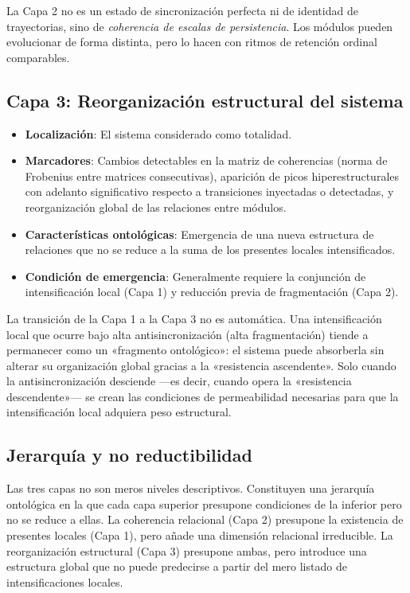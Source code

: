 La Capa 2 no es un estado de sincronización perfecta ni de identidad de trayectorias, sino de \textit{coherencia de escalas de persistencia}. Los módulos pueden evolucionar de forma distinta, pero lo hacen con ritmos de retención ordinal comparables.

\subsection{Capa 3: Reorganización estructural del sistema}

\begin{itemize}
    \item \textbf{Localización}: El sistema considerado como totalidad.
    \item \textbf{Marcadores}: Cambios detectables en la matriz de coherencias (norma de Frobenius entre matrices consecutivas), aparición de picos hiperestructurales con adelanto significativo respecto a transiciones inyectadas o detectadas, y reorganización global de las relaciones entre módulos.
    \item \textbf{Características ontológicas}: Emergencia de una nueva estructura de relaciones que no se reduce a la suma de los presentes locales intensificados.
    \item \textbf{Condición de emergencia}: Generalmente requiere la conjunción de intensificación local (Capa 1) y reducción previa de fragmentación (Capa 2).
\end{itemize}

\begin{importantbox}
La transición de la Capa 1 a la Capa 3 no es automática. Una intensificación local que ocurre bajo alta antisincronización (alta fragmentación) tiende a permanecer como un «fragmento ontológico»: el sistema puede absorberla sin alterar su organización global gracias a la «resistencia ascendente». Solo cuando la antisincronización desciende —es decir, cuando opera la «resistencia descendente»— se crean las condiciones de permeabilidad necesarias para que la intensificación local adquiera peso estructural.
\end{importantbox}

\subsection{Jerarquía y no reductibilidad}

Las tres capas no son meros niveles descriptivos. Constituyen una jerarquía ontológica en la que cada capa superior presupone condiciones de la inferior pero no se reduce a ellas. La coherencia relacional (Capa 2) presupone la existencia de presentes locales (Capa 1), pero añade una dimensión relacional irreducible. La reorganización estructural (Capa 3) presupone ambas, pero introduce una estructura global que no puede predecirse a partir del mero listado de intensificaciones locales.

